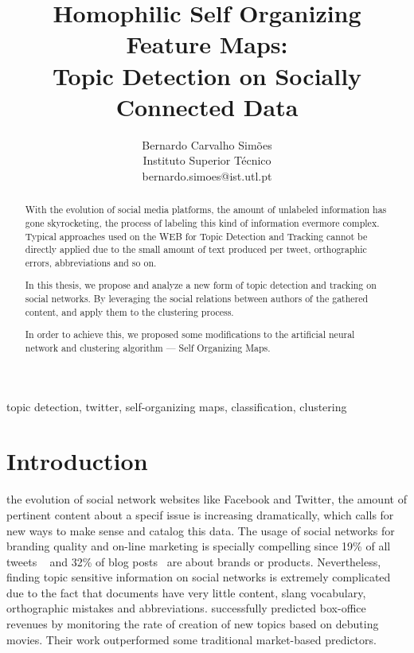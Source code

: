 \documentclass[journal]{IEEEtran}
\begin{document}
%
\title{Homophilic Self Organizing Feature Maps:\\ Topic Detection on Socially Connected Data}

\author{Bernardo Carvalho Simões \\Instituto Superior Técnico \\ bernardo.simoes@ist.utl.pt}

\maketitle

\begin{abstract}
With the evolution of social media platforms, the amount of unlabeled information has gone skyrocketing, the process of labeling this kind of information evermore complex. Typical approaches used on the WEB for Topic Detection and Tracking cannot be directly applied due to the small amount of text produced per tweet, orthographic errors, abbreviations and so on.

In this thesis, we propose and analyze a new form of topic detection and tracking on social networks. By leveraging the social relations between authors of the gathered content, and apply them to the clustering process.

In order to achieve this, we proposed some modifications to the artificial neural network  and clustering algorithm --- Self Organizing Maps. 
\end{abstract}

\begin{IEEEkeywords}
topic detection, twitter, self-organizing maps, classification, clustering
\end{IEEEkeywords}

\section{Introduction}
 the evolution of social network websites like Facebook and Twitter, the amount of pertinent content about a specif issue is increasing dramatically, which calls for new ways to make sense and catalog this data.
The usage of social networks for branding quality and on-line marketing is specially compelling since 19\% of all tweets ~\cite{Jansen2009} and 32\% of blog posts~\cite{Melville2009} are about brands or products. Nevertheless, finding topic sensitive information on social networks is extremely complicated due to the fact that documents have very little content, slang vocabulary, orthographic mistakes and abbreviations. \citet{Asur2010} successfully predicted box-office revenues by monitoring the rate of creation of new topics based on debuting movies. Their work outperformed some traditional market-based predictors.
\end{document}
